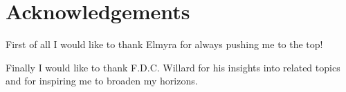 \documentclass[../bachelor_paper.tex]{subfiles}
\begin{document}
\section*{Acknowledgements}
    \label{chap:acknowledgements}
    \thispagestyle{empty}
    
    First of all I would like to thank Elmyra for always pushing me to the top!

    Finally I would like to thank F.D.C. Willard for his insights into related topics and for inspiring me to broaden my horizons.
\end{document}
